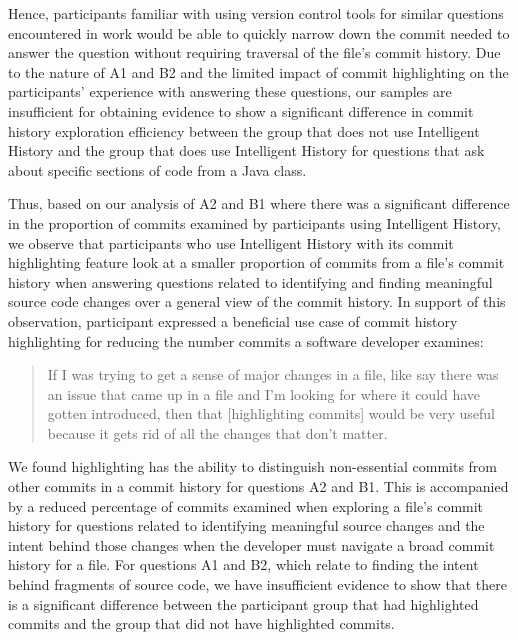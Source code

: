\begin{center}
\end{center}

Hence, participants familiar with using version control tools for similar questions encountered 
in  work would be able to quickly narrow down the commit needed to answer 
the question without requiring traversal of the file's commit history.
Due to the nature of A1 and B2 and the limited impact of commit highlighting 
on the participants' experience with answering these questions,
our samples are insufficient for obtaining evidence to show a significant difference in 
commit history exploration efficiency between the group that does not use Intelligent History 
and the group that does use Intelligent History for questions that ask about specific sections of code from a Java class.

Thus, based on our analysis of A2 and B1 where there was a significant difference in 
the proportion of commits examined by participants using Intelligent History, 
we observe that participants who use Intelligent History with its commit highlighting feature 
look at a smaller proportion of commits from a file's commit history when answering questions related to
identifying and finding meaningful source code changes over a general view of the commit history.
In support of this observation, 
participant  expressed a beneficial use case of commit history highlighting 
for reducing the number commits a software developer examines:

\begin{quote}
  If I was trying to get a sense of major changes in a file, like say there was an issue that came up in a file and I’m looking for where it could have gotten introduced, 
  then that [highlighting commits] would be very useful because it gets rid of all the changes that don’t matter. 
\end{quote}

We found highlighting has the ability to distinguish non-essential commits from other commits in a commit history
for questions A2 and B1.
This is accompanied by a reduced percentage of commits examined when exploring a file's commit history 
for questions related to identifying meaningful source changes 
and the intent behind those changes when the developer must navigate a broad commit history for a file. 
For questions A1 and B2, which relate to finding the intent behind fragments of source code,
we have insufficient evidence to show that there is a significant difference
between the participant group that had highlighted commits and the group that did not have highlighted commits.

